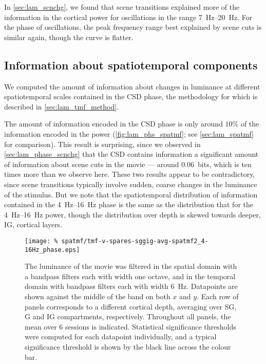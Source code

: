 In \autoref{sec:lam_scnchg}, we found that scene transitions explained more of the information in the cortical power for oscillations in the range \SIrange{7}{20}{Hz}.
For the phase of oscillations, the peak frequency range best explained by scene cuts is similar again, though the curve is flatter.


\subsection{Information about spatiotemporal components}

We computed the amount of information about changes in luminance at different spatiotemporal scales contained in the \ac{CSD} phase, the methodology for which is described in \autoref{sec:lam_tmf_method}.

The amount of information encoded in the \ac{CSD} phase is only around $10\%$ of the information encoded in the power (\autoref{fig:lam_phs_spatmf}; see \autoref{sec:lam_spatmf} for comparison).
This result is surprising, since we observed in \autoref{sec:lam_phase_scnchg} that the \ac{CSD} contains information a significant amount of information about scene cuts in the movie --- around \SI{0.06}{bits}, which is ten times more than we observe here.
These two results appear to be contradictory, since scene transitions typically involve sudden, coarse changes in the luminance of the stimulus.
But we note that the spatiotemporal distribution of information contained in the \SIrange{4}{16}{Hz} phase is the same as the distribution that for the \SIrange{4}{16}{Hz} power, though the distribution over depth is skewed towards deeper, \ac{IG}, cortical layers.


\begin{figure}[htbp]
\centering
    \texttt{[image: \%
spatmf/tmf-v-spares-sggig-avg-spatmf2\_4-16Hz\_phase.eps]}
\caption{%
The luminance of the movie was filtered in the spatial domain with a bandpass filters each with width one octave, and in the temporal domain with bandpass filters each with width \SI{6}{Hz}.
Datapoints are shown against the middle of the band on both $x$ and $y$.
Each row of panels corresponds to a different cortical depth, averaging over \ac{SG}, \ac{G} and \ac{IG} compartments, respectively.
Throughout all panels, the mean over \num{6} sessions is indicated.
Statistical significance thresholds were computed for each datapoint individually, and a typical significance threshold is shown by the black line across the colour bar.
}%
\label{fig:lam_phs_spatmf}
%
\end{figure}


